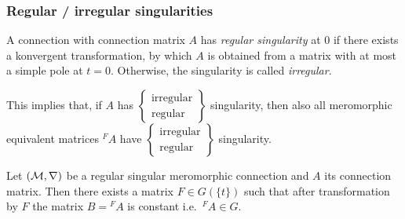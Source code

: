 \subsubsection{Regular / irregular singularities}
\begin{comment}
  see \cite[defn.5.1.6]{hotta2008}
\end{comment}
\begin{defn}
  A connection with connection matrix $A$ has \emph{regular singularity} at $0$
  if there exists a konvergent transformation, by which $A$ is obtained from a
  matrix with at most a simple pole at $t=0$.
  Otherwise, the singularity is called \emph{irregular}.
  \begin{s-rem}
    This implies that, if $A$ has
    $\left\{\substack{\text{irregular}\\\text{regular}}\right\}$
    singularity, then also all
    meromorphic equivalent matrices ${}^{F}\!A$ have
    $\left\{\substack{\text{irregular}\\\text{regular}}\right\}$
    singularity.
  \end{s-rem}
  \begin{comment}
    \begin{s-rem}
      \marginnote{\cite[150]{van2003galois}}
      One can express this notion of regular singular also in terms of
      $\delta:=t\frac{d}{dt}$. A system has regular singularity if it is
      equivalent to an equation $\delta-A$ where $A$ has entries in
      holomorphic functions in a neighbourhood of $z=0$.
    \end{s-rem}
  \end{comment}
\end{defn}
\begin{thm}
  \begin{comment}
    see
    \begin{itemize}
      \item \cite[Thm.II.2.8]{sabbah2007isomonodromic}
      \item \cite[5.1.2]{hotta2008}
    \end{itemize}
  \end{comment}
  Let $(\mathcal{M},\nabla)$ be a regular singular meromorphic connection and $A$ its
  connection matrix.
  Then there exists a matrix $F\in G(\!\{t\}\!)$ such that after transformation
  by $F$ the matrix $B={}^F\!A$ is constant i.e.\ ${}^F\!A\in G$.
\end{thm}

